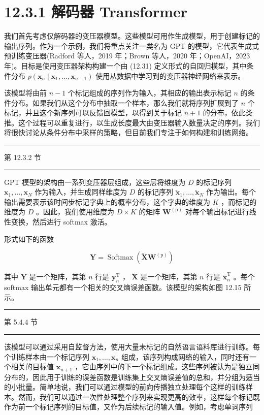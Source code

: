 \documentclass[10pt]{article}
\newcommand{\HRule}{\begin{center}\rule{0.9\linewidth}{0.2mm}\end{center}}
\begin{document}
\section*{12.3.1 解码器 Transformer}

我们首先考虑仅解码器的变压器模型。这些模型可用作生成模型，用于创建标记的输出序列。作为一个示例，我们将重点关注一类名为 GPT 的模型，它代表生成式预训练变压器(Radford 等人，2019 年；Brown 等人，2020 年；OpenAI，2023 年)。目标是使用变压器架构构建一个由 (12.31) 定义形式的自回归模型，其中条件分布 \(p\left( {{\mathbf{x}}_{n} \mid  {\mathbf{x}}_{1},\ldots ,{\mathbf{x}}_{n - 1}}\right)\) 使用从数据中学习到的变压器神经网络来表示。

该模型将由前 \(n - 1\) 个标记组成的序列作为输入，其相应的输出表示标记 \(n\) 的条件分布。如果我们从这个分布中抽取一个样本，那么我们就将序列扩展到了 \(n\) 个标记，并且这个新序列可以反馈回模型，以得到关于标记 \(n + 1\) 的分布，依此类推。这个过程可以重复进行，以生成长度最大由变压器输入数量决定的序列。我们将很快讨论从条件分布中采样的策略，但目前我们专注于如何构建和训练网络。

\HRule

第 12.3.2 节

\HRule

GPT 模型的架构由一系列变压器层组成，这些层将维度为 \(D\) 的标记序列 \({\mathbf{x}}_{1},\ldots ,{\mathbf{x}}_{N}\) 作为输入，并生成同样维度为 \(D\) 的标记序列 \({\widetilde{\mathbf{x}}}_{1},\ldots ,{\widetilde{\mathbf{x}}}_{N}\) 作为输出。每个输出需要表示该时间步标记字典上的概率分布，这个字典的维度为 \(K\) ，而标记的维度为 \(D\) 。因此，我们使用维度为 \(D \times  K\) 的矩阵 \({\mathbf{W}}^{\left( \mathrm{p}\right) }\) 对每个输出标记进行线性变换，然后进行 softmax 激活。

形式如下的函数

\[
\mathbf{Y} = \operatorname{Softmax}\left( {\widetilde{\mathbf{X}}{\mathbf{W}}^{\left( \mathrm{p}\right) }}\right)  \tag{12.33}
\]

其中 \(\mathbf{Y}\) 是一个矩阵，其第 \(n\) 行是 \({\mathbf{y}}_{n}^{\mathrm{T}}\) ， \(\widetilde{\mathbf{X}}\) 是一个矩阵，其第 \(n\) 行是 \({\widetilde{\mathbf{x}}}_{n}^{\mathrm{T}}\) 。每个 softmax 输出单元都有一个相关的交叉熵误差函数。该模型的架构如图 12.15 所示。

\HRule

第 5.4.4 节

\HRule

该模型可以通过采用自监督方法，使用大量未标记的自然语言语料库进行训练。每个训练样本由一个标记序列 \({\mathbf{x}}_{1},\ldots ,{\mathbf{x}}_{n}\) 组成，该序列构成网络的输入，同时还有一个相关的目标值 \({\mathbf{x}}_{n + 1}\) ，它由序列中的下一个标记组成。这些序列被认为是独立同分布的，因此用于训练的误差函数是训练集上交叉熵误差值的总和，并分组为适当的小批量。简单地说，我们可以通过模型的前向传播独立处理每个这样的训练样本。然而，我们可以通过一次性处理整个序列来实现更高的效率，这样每个标记既作为前一个标记序列的目标值，又作为后续标记的输入值。例如，考虑单词序列
\end{document}
